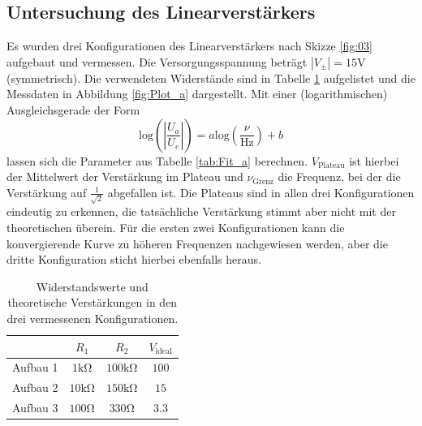 \subsection{Untersuchung des Linearverstärkers}
Es wurden drei Konfigurationen des Linearverstärkers nach Skizze \ref{fig:03} aufgebaut und vermessen. Die Versorgungsspannung beträgt $\left|V_{\pm}\right|=15\si{\volt}$ (symmetrisch). Die verwendeten Widerstände sind in Tabelle \ref{tab:Data_a} aufgelistet und die Messdaten in Abbildung \ref{fig:Plot_a} dargestellt. Mit einer (logarithmischen) Ausgleichsgerade der Form
\begin{equation}
  \text{log}\left(\left|\frac{U_a}{U_e}\right|\right) = a\text{log}\left(\frac{\nu}{\text{Hz}}\right) + b
  \label{eqn:log_fit}
\end{equation}
lassen sich die Parameter aus Tabelle \ref{tab:Fit_a} berechnen. $V_{\text{Plateau}}$ ist hierbei der Mittelwert der Verstärkung im Plateau und $\nu_{\text{Grenz}}$ die Frequenz, bei der die Verstärkung auf $\frac{1}{\sqrt{2}}$ abgefallen ist.
Die Plateaus sind in allen drei Konfigurationen eindeutig zu erkennen, die tatsächliche Verstärkung stimmt aber nicht mit der theoretischen überein. Für die ersten zwei Konfigurationen kann die konvergierende Kurve zu höheren Frequenzen nachgewiesen werden, aber die dritte Konfiguration sticht hierbei ebenfalls heraus.

\begin{table}
  \centering
  \caption{Widerstandswerte und theoretische Verstärkungen in den drei vermessenen Konfigurationen.}
  \label{tab:Data_a}
  \begin{tabular}{c|ccc}
    \toprule
              & $R_1$              & $R_2$               & $V_{\text{ideal}}$\\
    \midrule
    Aufbau 1  & $1\si{\kilo\ohm}$  & $100\si{\kilo\ohm}$ & $100$\\
    Aufbau 2  & $10\si{\kilo\ohm}$ & $150\si{\kilo\ohm}$ & $15$\\
    Aufbau 3  & $100\si{\ohm}$     & $330\si{\ohm}$      & $3.3$\\
    \bottomrule
  \end{tabular}
\end{table}

